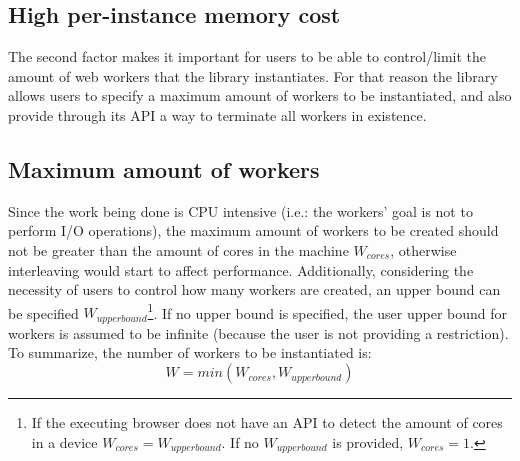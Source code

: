 \subsection{High per-instance memory cost}
The second factor makes it important for users to be able to control/limit the amount of web workers that the library instantiates. For that reason the library allows users to specify a maximum amount of workers to be instantiated, and also provide through its API a way to terminate all workers in existence.

\subsection{Maximum amount of workers}
Since the work being done is CPU intensive (i.e.: the workers' goal is not to perform I/O operations), the maximum amount of workers to be created should not be greater than the amount of cores in the machine \(W_{cores}\), otherwise interleaving would start to affect performance. Additionally, considering the necessity of users to control how many workers are created, an upper bound can be specified \(W_{upper bound}\)\footnote{If the executing browser does not have an API to detect the amount of cores in a device \(W_{cores}=W_{upper bound}\). If no \(W_{upper bound}\) is provided, \(W_{cores}=1\).}. If no upper bound is specified, the user upper bound for workers is assumed to be infinite (because the user is not providing a restriction). To summarize, the number of workers to be instantiated is:
\[W = min(W_{cores}, W_{upper bound})\]

\pagebreak